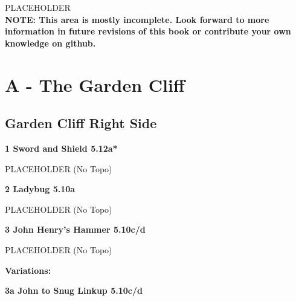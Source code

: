 \begin{multicols}{2}
PLACEHOLDER\\

\textbf{NOTE: This area is mostly incomplete. Look forward to more information in future revisions of this book or contribute your own knowledge on github.}\\


\newpage

\section{A - The Garden Cliff}\label{sa:The Garden Cliff}




\needspace{1.5cm}
\subsection*{Garden Cliff Right Side}\label{bf:Garden Cliff Right Side}
	


\needspace{1.5cm}
\label{rt:Sword and Shield}
\colorbox{Goldenrod!50}{
\parbox{0.95\linewidth}{
\textbf{
1 Sword and Shield 5.12a*  
}}}

\begin{adjustwidth}{0.5cm}{}			
PLACEHOLDER (No Topo)
\end{adjustwidth}



\needspace{1.5cm}
\label{rt:Ladybug}
\colorbox{RoyalBlue!20}{
\parbox{0.95\linewidth}{
\textbf{
2 Ladybug 5.10a  
}}}

\begin{adjustwidth}{0.5cm}{}			
PLACEHOLDER (No Topo)
\end{adjustwidth}



\needspace{1.5cm}
\label{rt:John Henry's Hammer}
\colorbox{RoyalBlue!20}{
\parbox{0.95\linewidth}{
\textbf{
3 John Henry's Hammer 5.10c/d  
}}}

\begin{adjustwidth}{0.5cm}{}			
PLACEHOLDER (No Topo)
\end{adjustwidth}

\begin{adjustwidth}{0.5cm}{}				
\needspace{3cm}
\textbf{Variations:} \newline

\needspace{1.5cm}
\label{vr:John to Snug Linkup}
\colorbox{RoyalBlue!20}{
\parbox{0.95\linewidth}{
\textbf{
3a John to Snug Linkup 5.10c/d  
}}}


\end{adjustwidth}
\end{multicols}
